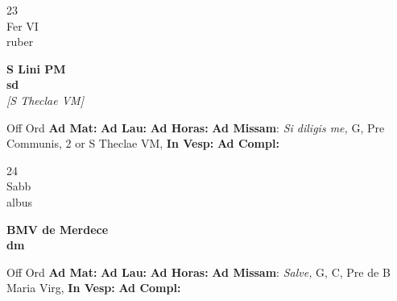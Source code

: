 \documentclass[10pt, openany]{book}
\begin{document}
        \begin{center}
            \begin{minipage}{3.5in}
                \vspace{2em}
                \begin{minipage}{0.5in}
                    {\Huge 23} \\
                    {\normalsize Fer VI} \\
                    {\normalsize ruber}
                \end{minipage}
                \begin{minipage}{3.0in}
                    \textbf{ \large S Lini PM \\
                    \textnormal{\normalsize sd}} \\ \textit{[S Theclae VM]} \\ 
                \end{minipage}
                \begin{justify}Off Ord
                    \textbf{Ad Mat: }
                    \textbf{Ad Lau: }
                    \textbf{Ad Horas: }\textbf{Ad Missam}: \textit{Si diligis me,} G, Pre Communis, 2 or S Theclae VM,  
                    \textbf{In Vesp: }
                    \textbf{Ad Compl: }
                \end{justify}
            \end{minipage}
        \end{center}
    
        \begin{center}
            \begin{minipage}{3.5in}
                \vspace{2em}
                \begin{minipage}{0.5in}
                    {\Huge 24} \\
                    {\normalsize Sabb} \\
                    {\normalsize albus}
                \end{minipage}
                \begin{minipage}{3.0in}
                    \textbf{ \large BMV de Merdece \\
                    \textnormal{\normalsize dm}} \\ 
                \end{minipage}
                \begin{justify}Off Ord
                    \textbf{Ad Mat: }
                    \textbf{Ad Lau: }
                    \textbf{Ad Horas: }\textbf{Ad Missam}: \textit{Salve,} G, C, Pre de B Maria Virg,  
                    \textbf{In Vesp: }
                    \textbf{Ad Compl: }
                \end{justify}
            \end{minipage}
        \end{center}
    
\end{document}

